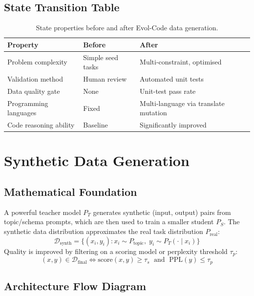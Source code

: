 \subsection{State Transition Table}
\begin{table}[h]\centering
\begin{tabular}{lll}\toprule
\textbf{Property} & \textbf{Before} & \textbf{After}\\\midrule
Problem complexity & Simple seed tasks & Multi-constraint, optimised\\
Validation method & Human review & Automated unit tests\\
Data quality gate & None & Unit-test pass rate\\
Programming languages & Fixed & Multi-language via translate mutation\\
Code reasoning ability & Baseline & Significantly improved\\\bottomrule
\end{tabular}
\caption{State properties before and after Evol-Code data generation.}
\end{table}

\newpage
\section{Synthetic Data Generation}

\subsection{Mathematical Foundation}
A powerful teacher model $P_T$ generates synthetic (input, output) pairs from topic/schema prompts, which are then used to train a smaller student $P_S$. The synthetic data distribution approximates the real task distribution $P_{\text{real}}$:
\begin{equation}
  \mathcal{D}_{\text{synth}} = \{(x_i, y_i) : x_i \sim P_{\text{topic}},\; y_i \sim P_T(\cdot \mid x_i)\}
\end{equation}
Quality is improved by filtering on a scoring model or perplexity threshold $\tau_p$:
\begin{equation}
  (x,y) \in \mathcal{D}_{\text{final}} \iff \text{score}(x,y) \geq \tau_s \;\text{ and }\; \text{PPL}(y) \leq \tau_p
\end{equation}

\subsection{Architecture Flow Diagram}

